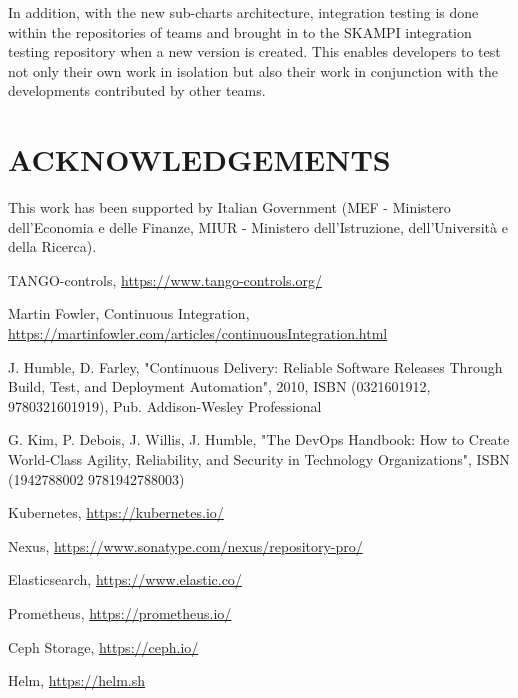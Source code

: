 \documentclass[a4paper,
               keeplastbox,   %
               ]{jacow}
\begin{document}
In addition, with the new sub-charts architecture, integration testing is done within the repositories of teams and brought in to the SKAMPI integration testing repository when a new version is created.  This enables developers to test not only their own work in isolation but also their work in conjunction with the developments contributed by other teams.

\section{ACKNOWLEDGEMENTS}
This work has been supported by Italian Government (MEF - Ministero dell'Economia e delle Finanze, MIUR - Ministero dell'Istruzione, dell'Università e della Ricerca).

%
	{\printbibliography}%
	{%
	
	\begin{thebibliography}{99} %
	
		TANGO-controls,
		\url{https://www.tango-controls.org/}
	
		Martin Fowler, Continuous Integration,
		\url{https://martinfowler.com/articles/continuousIntegration.html}
		
	    J. Humble, D. Farley, "Continuous Delivery: Reliable Software Releases Through Build, Test, and Deployment Automation",
	    2010, ISBN (0321601912, 9780321601919), Pub. Addison-Wesley Professional
	
	    G. Kim, P. Debois, J. Willis, J. Humble, "The DevOps Handbook: How to Create World-Class Agility, Reliability, and Security in Technology Organizations", ISBN (1942788002 9781942788003)

		Kubernetes,
		\url{https://kubernetes.io/}

		Nexus,
		\url{https://www.sonatype.com/nexus/repository-pro/}

		Elasticsearch,
		\url{https://www.elastic.co/}

		Prometheus,
		\url{https://prometheus.io/}

		Ceph Storage,
		\url{https://ceph.io/}

		Helm,
		\url{https://helm.sh}


\end{thebibliography}}
\end{document}
